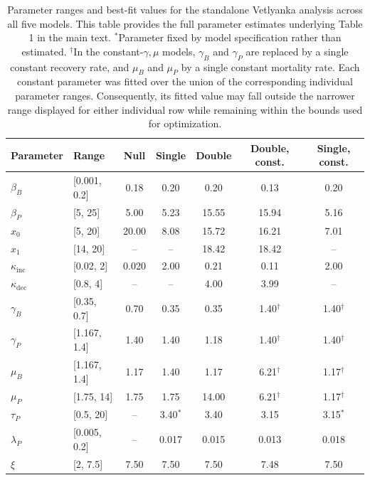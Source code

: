 \begin{table}[H]
    \centering
    \small
    \caption{Parameter ranges and best-fit values for the standalone Vetlyanka analysis across all five models. This table provides the full parameter estimates underlying Table 1 in the main text. $^{*}$Parameter fixed by model specification rather than estimated. $^{\dagger}$In the constant-$\gamma,\mu$ models, $\gamma_B$ and $\gamma_P$ are replaced by a single constant recovery rate, and $\mu_B$ and $\mu_P$ by a single constant mortality rate. Each constant parameter was fitted over the union of the corresponding individual parameter ranges. Consequently, its fitted value may fall outside the narrower range displayed for either individual row while remaining within the bounds used for optimization.}
    \begin{tabular}{llccccc}
        \toprule
        \textbf{Parameter} & \textbf{Range} & \textbf{Null} & \textbf{Single} & \textbf{Double} & \textbf{Double, const.} & \textbf{Single, const.} \\
        \midrule
        $\beta_B$ & [0.001, 0.2] & 0.18 & 0.20 & 0.20 & 0.13 & 0.20 \\
        $\beta_P$ & [5, 25] & 5.00 & 5.23 & 15.55 & 15.94 & 5.16 \\
        $x_0$ & [5, 20] & 20.00 & 8.08 & 15.72 & 16.21 & 7.01 \\
        $x_1$ & [14, 20] & -- & -- & 18.42 & 18.42 & -- \\
        $\kappa_{\mathrm{inc}}$ & [0.02, 2] & 0.020 & 2.00 & 0.21 & 0.11 & 2.00 \\
        $\kappa_{\mathrm{dec}}$ & [0.8, 4] & -- & -- & 4.00 & 3.99 & -- \\
        $\gamma_B$ & [0.35, 0.7] & 0.70 & 0.35 & 0.35 & 1.40$^{\dagger}$ & 1.40$^{\dagger}$ \\
        $\gamma_P$ & [1.167, 1.4] & 1.40 & 1.40 & 1.18 & 1.40$^{\dagger}$ & 1.40$^{\dagger}$ \\
        $\mu_B$ & [1.167, 1.4] & 1.17 & 1.40 & 1.17 & 6.21$^{\dagger}$ & 1.17$^{\dagger}$ \\
        $\mu_P$ & [1.75, 14] & 1.75 & 1.75 & 14.00 & 6.21$^{\dagger}$ & 1.17$^{\dagger}$ \\
        $\tau_P$ & [0.5, 20] & -- & 3.40$^{*}$ & 3.40 & 3.15 & 3.15$^{*}$ \\
        $\lambda_P$ & [0.005, 0.2] & -- & 0.017 & 0.015 & 0.013 & 0.018 \\
        $\xi$ & [2, 7.5] & 7.50 & 7.50 & 7.50 & 7.48 & 7.50 \\
        \bottomrule
    \end{tabular}
    \label{tab:vetlyanka_ranges_best_fit_days_five_models}
\end{table}
